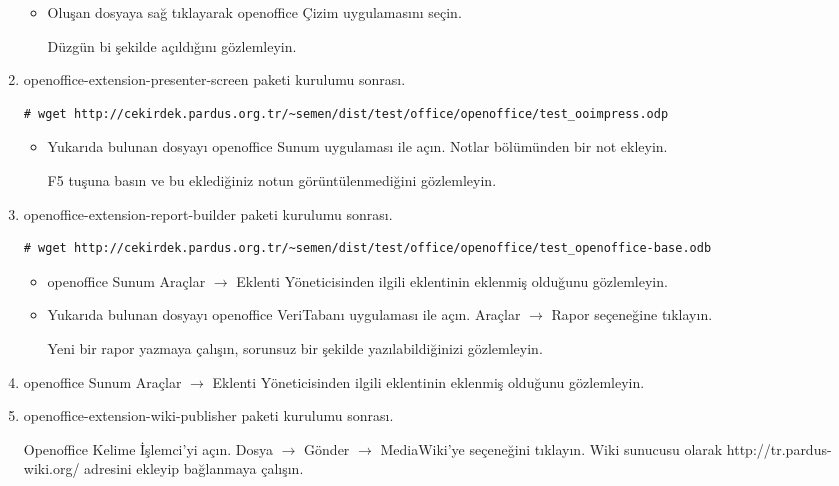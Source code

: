 \documentclass[a4paper,10pt]{article}
\begin{document}
\begin{enumerate}
\begin{itemize}
\item Oluşan dosyaya sağ tıklayarak openoffice Çizim uygulamasını seçin.

Düzgün bi şekilde açıldığını gözlemleyin.

\end{itemize}
 
\item openoffice-extension-presenter-screen paketi kurulumu sonrası.
\begin{verbatim}
# wget http://cekirdek.pardus.org.tr/~semen/dist/test/office/openoffice/test_ooimpress.odp
\end{verbatim}

\begin{itemize}


\item Yukarıda bulunan dosyayı openoffice Sunum uygulaması ile açın. Notlar bölümünden bir not ekleyin. 

F5 tuşuna basın ve bu eklediğiniz notun görüntülenmediğini gözlemleyin.

\end{itemize}
\item openoffice-extension-report-builder paketi kurulumu sonrası.
\begin{verbatim}
# wget http://cekirdek.pardus.org.tr/~semen/dist/test/office/openoffice/test_openoffice-base.odb
\end{verbatim}

\begin{itemize}
\item openoffice Sunum Araçlar $\rightarrow$ Eklenti Yöneticisinden ilgili eklentinin eklenmiş olduğunu gözlemleyin.

\item Yukarıda bulunan dosyayı openoffice VeriTabanı uygulaması ile açın. Araçlar $\rightarrow$ Rapor seçeneğine tıklayın.

Yeni bir rapor yazmaya çalışın, sorunsuz bir şekilde yazılabildiğinizi gözlemleyin.

\end{itemize}
\item openoffice Sunum Araçlar $\rightarrow$ Eklenti Yöneticisinden ilgili eklentinin eklenmiş olduğunu gözlemleyin.

\item openoffice-extension-wiki-publisher paketi kurulumu sonrası.

Openoffice Kelime İşlemci'yi açın. Dosya $\rightarrow$ Gönder $\rightarrow$ MediaWiki'ye seçeneğini tıklayın. Wiki sunucusu olarak http://tr.pardus-wiki.org/ adresini ekleyip bağlanmaya çalışın.


\end{enumerate}
\end{document}
